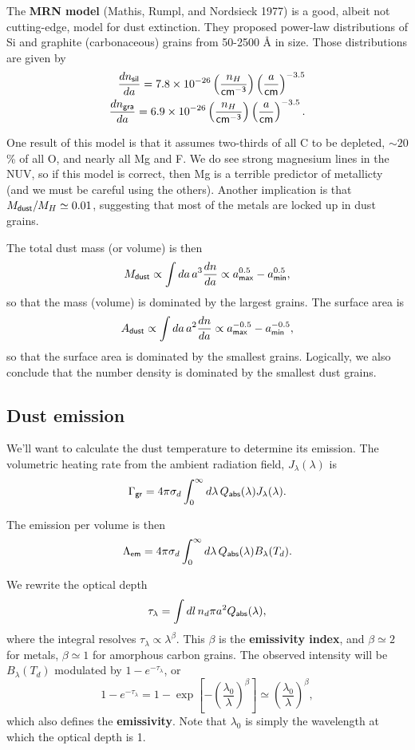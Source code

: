 \documentclass{tufte-handout}
\renewcommand{\textbf}[1]{{\bf \textcolor{dark-gray}{#1}}}
\renewcommand{\rm}{\sf}
\newcommand{\e}[1]{\times 10^{#1}}
\begin{document}
The \textbf{MRN model} (Mathis, Rumpl, and Nordsieck 1977) is a good, albeit not cutting-edge, model for dust extinction. They proposed power-law distributions of Si and graphite (carbonaceous) grains from 50-2500 \AA{} in size. Those distributions are given by
\begin{align*}
\frac{dn_{\rm sil}}{da} = 7.8\e{-26} \left (\frac{n_H}{\rm cm^{-3}} \right )\left (\frac{a}{\rm cm}\right )^{-3.5}\\
\frac{dn_{\rm gra}}{da} = 6.9\e{-26} \left (\frac{n_H}{\rm cm^{-3}} \right )\left (\frac{a}{\rm cm}\right )^{-3.5}.
\end{align*}

One result of this model is that it assumes two-thirds of all C to be depleted, $\sim 20$\% of all O, and nearly all Mg and F. We do see strong magnesium lines in the NUV, so if this model is correct, then Mg is a terrible predictor of metallicty (and we must be careful using the others). Another implication is that $M_{\rm dust}/M_{H} \simeq 0.01$, suggesting that most of the metals are locked up in dust grains.

The total dust mass (or volume) is then
\[M_{\rm dust} \propto \int da\, a^3 \frac{dn}{da} \propto a_{\rm max}^{0.5} - a_{\rm min}^{0.5},\]
so that the mass (volume) is dominated by the largest grains. The surface area is
\[A_{\rm dust} \propto \int da\, a^2 \frac{dn}{da} \propto a_{\rm max}^{-0.5} - a_{\rm min}^{-0.5},\]
so that the surface area is dominated by the smallest grains. Logically, we also conclude that the number density is dominated by the smallest dust grains.

\subsection{Dust emission}
We'll want to calculate the dust temperature to determine its emission. The volumetric heating rate from the ambient radiation field, $J_\lambda(\lambda)$ is
\[\Gamma_{\rm gr} = 4\pi \sigma_{d} \int_0^\infty d\lambda \, Q_{\rm abs}(\lambda) J_\lambda(\lambda).\]

The emission per volume is then
\[\Lambda_{\rm em} = 4\pi \sigma_d \int_0^\infty d\lambda \, Q_{\rm abs}(\lambda) B_\lambda(T_d).\]

We rewrite the optical depth
\begin{equation}
\tau_\lambda = \int dl \, n_d \pi a^2 Q_{\rm abs}(\lambda),
\end{equation}
where the integral resolves $\tau_\lambda \propto \lambda^{\beta}$. This $\beta$ is the \textbf{emissivity index}, and $\beta \simeq 2$ for metals, $\beta \simeq 1$ for amorphous carbon grains. The observed intensity will be $B_\lambda(T_d)$ modulated by $1 - e^{-\tau_{\lambda}}$, or
\[1-e^{-\tau_\lambda} = 1 - \exp\left [- \left (\frac{\lambda_0}{\lambda}\right )^{\beta}\right ] \simeq \left (\frac{\lambda_0}{\lambda}\right )^{\beta},\]
which also defines the \textbf{emissivity}. Note that $\lambda_0$ is simply the wavelength at which the optical depth is 1.
\end{document}
